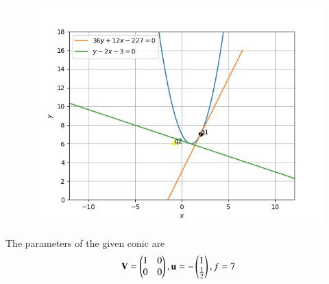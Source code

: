 	\begin{figure}[!h]
		\centering
 \includegraphics[width=\columnwidth]{chapters/12/6/3/15/figs/conic.png}
		\caption{}
		\label{fig:12/6/3/15}
  	\end{figure}
The parameters of the given conic are
\begin{align}
\mathbf{V} =\begin{pmatrix}
	1 & 0\\
	0 & 0
	\end{pmatrix},
    \mathbf{u}=-\begin{pmatrix}
	1 \\
	\frac{1}{2}
	\end{pmatrix},
    f=7
    \end{align}
